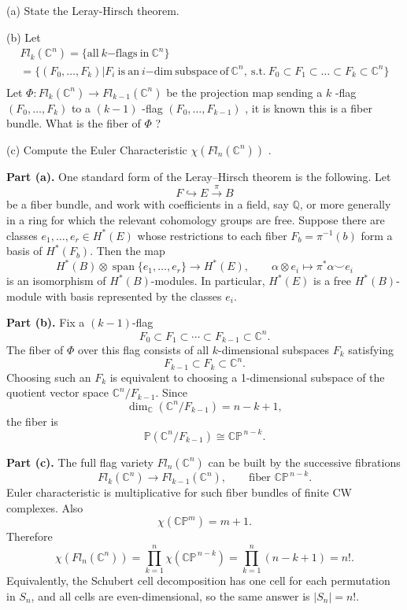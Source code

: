 \begin{exercise}
\label{geometry:2023:4}
(a) State the Leray-Hirsch theorem.

(b) Let
$$
\begin{array}{l} F l _ {k} (\mathbb {C} ^ {n}) = \{\mathrm {a l l\ } k \mathrm {-flags\ in\ } \mathbb {C} ^ {n} \} \\ = \{(F _ {0}, \dots , F _ {k}) | F _ {i} \mathrm {\ is\ an\ } i \mathrm {-dim\ subspace\ of\ } \mathbb {C} ^ {n}, \mathrm {\ s.t.\ } F _ {0} \subset F _ {1} \subset \dots \subset F _ {k} \subset \mathbb {C} ^ {n} \} \\ \end{array}
$$
Let $\Phi : F l _ { k } ( \mathbb { C } ^ { n } ) \to F l _ { k - 1 } ( \mathbb { C } ^ { n } )$ be the projection map sending a $k$ -flag $( F _ { 0 } , \dots , F _ { k } )$ to a $( k - 1 )$ -flag $( F _ { 0 } , \dots , F _ { k - 1 } )$ , it is known this is a fiber bundle. What is the fiber of $\Phi$ ?

(c) Compute the Euler Characteristic $\chi ( F l _ { n } ( \mathbb { C } ^ { n } ) )$ .
\end{exercise}

\begin{solution}
\textbf{Part (a).}
One standard form of the Leray--Hirsch theorem is the following. Let
\[
    F\hookrightarrow E\xrightarrow{\pi}B
\]
be a fiber bundle, and work with coefficients in a field, say $\mathbb{Q}$, or
more generally in a ring for which the relevant cohomology groups are free. Suppose
there are classes $e_1,\ldots,e_r\in H^*(E)$ whose restrictions to each fiber
$F_b=\pi^{-1}(b)$ form a basis of $H^*(F_b)$. Then the map
\[
    H^*(B)\otimes \operatorname{span}\{e_1,\ldots,e_r\}
    \longrightarrow
    H^*(E),
    \qquad
    \alpha\otimes e_i\mapsto \pi^*\alpha\smile e_i
\]
is an isomorphism of $H^*(B)$-modules. In particular, $H^*(E)$ is a free
$H^*(B)$-module with basis represented by the classes $e_i$.

\textbf{Part (b).}
Fix a $(k-1)$-flag
\[
    F_0\subset F_1\subset\cdots\subset F_{k-1}\subset\mathbb{C}^n.
\]
The fiber of $\Phi$ over this flag consists of all $k$-dimensional subspaces
$F_k$ satisfying
\[
    F_{k-1}\subset F_k\subset\mathbb{C}^n.
\]
Choosing such an $F_k$ is equivalent to choosing a 1-dimensional subspace of the
quotient vector space $\mathbb{C}^n/F_{k-1}$. Since
\[
    \dim_{\mathbb{C}}(\mathbb{C}^n/F_{k-1})=n-k+1,
\]
the fiber is
\[
    \mathbb{P}(\mathbb{C}^n/F_{k-1})
    \cong
    \mathbb{CP}^{\,n-k}.
\]

\textbf{Part (c).}
The full flag variety $Fl_n(\mathbb{C}^n)$ can be built by the successive
fibrations
\[
    Fl_k(\mathbb{C}^n)\longrightarrow Fl_{k-1}(\mathbb{C}^n),
    \qquad
    \text{fiber }\mathbb{CP}^{\,n-k}.
\]
Euler characteristic is multiplicative for such fiber bundles of finite CW
complexes. Also
\[
    \chi(\mathbb{CP}^m)=m+1.
\]
Therefore
\[
    \chi(Fl_n(\mathbb{C}^n))
    =
    \prod_{k=1}^{n}\chi(\mathbb{CP}^{\,n-k})
    =
    \prod_{k=1}^{n}(n-k+1)
    =
    n!.
\]
Equivalently, the Schubert cell decomposition has one cell for each permutation
in $S_n$, and all cells are even-dimensional, so the same answer is $|S_n|=n!$.
\end{solution}

